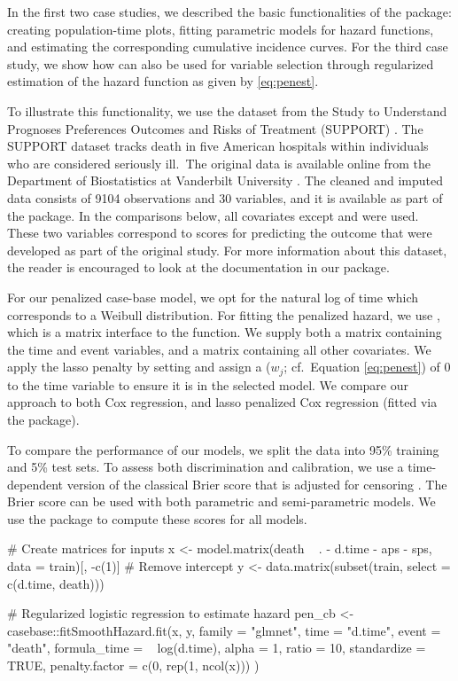 In the first two case studies, we described the basic functionalities of
the  package: creating population-time plots, fitting
parametric models for hazard functions, and estimating the corresponding
cumulative incidence curves. For the third case study, we show how
 can also be used for variable selection through
regularized estimation of the hazard function as given by
\eqref{eq:penest}.

To illustrate this functionality, we use the dataset from the Study to
Understand Prognoses Preferences Outcomes and Risks of Treatment
(SUPPORT) \citep{knaus1995support}. The SUPPORT dataset tracks death in
five American hospitals within individuals who are considered seriously
ill.~The original data is available online from the Department of
Biostatistics at Vanderbilt University \citep{harrell_2020}. The cleaned
and imputed data consists of 9104 observations and 30 variables, and it
is available as part of the  package. In the comparisons
below, all covariates except  and  were used. These
two variables correspond to scores for predicting the outcome that were
developed as part of the original study. For more information about this
dataset, the reader is encouraged to look at the documentation in our
package.

For our penalized case-base model, we opt for the natural log of time
which corresponds to a Weibull distribution. For fitting the penalized
hazard, we use , which is a matrix interface
to the  function. We supply both a matrix 
containing the time and event variables, and a matrix 
containing all other covariates. We apply the lasso penalty by setting
 and assign a  (\(w_j\);
cf.~Equation \ref{eq:penest}) of 0 to the time variable to ensure it is
in the selected model. We compare our approach to both Cox regression,
and lasso penalized Cox regression (fitted via the 
package).

To compare the performance of our models, we split the data into 95\%
training and 5\% test sets. To assess both discrimination and
calibration, we use a time-dependent version of the classical Brier
score that is adjusted for censoring \citep{graf1999ass}. The Brier
score can be used with both parametric and semi-parametric models. We
use the  package to compute these scores for all
models.

\begin{Schunk}
\begin{Sinput}
# Create matrices for inputs
x <- model.matrix(death ~ . - d.time - aps - sps, 
                  data = train)[, -c(1)] # Remove intercept
y <- data.matrix(subset(train, select = c(d.time, death)))

# Regularized logistic regression to estimate hazard
pen_cb <- casebase::fitSmoothHazard.fit(x, y,
  family = "glmnet",
  time = "d.time", event = "death",
  formula_time = ~ log(d.time), alpha = 1,
  ratio = 10, standardize = TRUE,
  penalty.factor = c(0, rep(1, ncol(x)))
)
\end{Sinput}
\end{Schunk}

